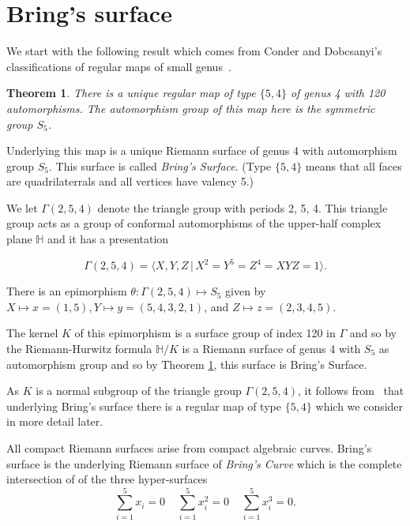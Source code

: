\documentclass{amsproc}
\numberwithin{equation}{section}
\numberwithin{equation}{section}
\newtheorem{theorem}{Theorem}[section]
\theoremstyle{definition}
\theoremstyle{remark}
\numberwithin{equation}{section}
\begin{document}
 \section{Bring's surface} We start with the following result which comes from Conder and Dobcsanyi's classifications of regular maps of small genus~\cite{CD01}.
 
  \begin{theorem} \label{th1}There is a unique regular map of type $\{5,4\}$ of genus 4 with 120 automorphisms.  The automorphism group of this map here is the symmetric group $S_5$.
    \end{theorem}

  Underlying this map is a unique Riemann surface of genus 4 with automorphism group $S_5$.  This surface is called {\it Bring's Surface}.  (Type $\{5, 4\}$ means that all faces are quadrilaterrals and all vertices have valency 5.)

 
We let $\Gamma(2, 5, 4)$ denote the triangle group with periods 2, 5, 4.  This triangle group acts as a group of conformal  automorphisms of the upper-half complex plane $\mathbb{H}$ and it has a presentation  
 
$$\Gamma(2,5,4)=\langle X,Y,Z\,|\,X^{2}=Y^{5}=Z^{4}=XYZ=1\rangle.$$
  \vspace{0.2cm}

  There is an epimorphism $\theta:\Gamma(2,5,4)\mapsto S_5$ given by $X\mapsto x=(1, 5),   Y\mapsto y=(5,4,3,2, 1)$,  and $Z\mapsto z=(2, 3, 4, 5).$
  
  The kernel $K$ of this epimorphism is a surface group of index 120 in $\Gamma$ and so by the Riemann-Hurwitz formula $\mathbb{H}/K$ is a Riemann surface of genus 4 with $S_5$ as automorphism group and so by Theorem \ref{th1}, this surface is Bring's Surface.
  
  As $K$ is a normal subgroup of the triangle group $\Gamma(2, 5, 4)$, it follows from~\cite{JS78} that underlying  Bring's surface  there is a regular map of type $\{5, 4\}$ which we consider in more detail later.

  \vspace{0.2cm}

  All compact Riemann surfaces arise from compact algebraic curves.  Bring's surface is the underlying Riemann surface of  {\it Bring's Curve} which is the complete intersection of of the three hyper-surfaces
\begin{equation}
\sum_{i=1}^{5} x_i = 0\;\;\;\; \sum_{i=1}^{5} x_i^{2} = 0\;\;\;\;\sum_{i=1}^{5} x_i^{3} = 0.
\end{equation} 
  \vspace{0.2cm}
\end{document}
